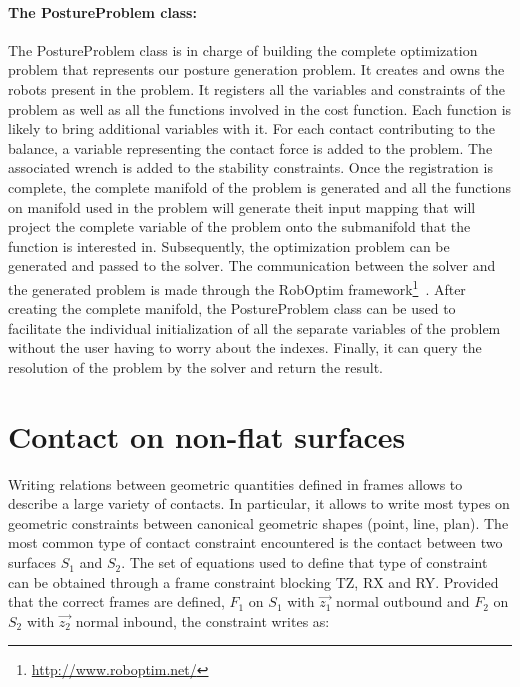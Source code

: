 \paragraph{The PostureProblem class:}
The PostureProblem class is in charge of building the complete optimization problem that represents our posture generation problem.
It creates and owns the robots present in the problem.
It registers all the variables and constraints of the problem as well as all the functions involved in the cost function.
Each function is likely to bring additional variables with it.
For each contact contributing to the balance, a variable representing the contact force is added to the problem.
The associated wrench is added to the stability constraints.
Once the registration is complete, the complete manifold of the problem is generated and all the functions on manifold used in the problem will generate theit input mapping that will project the complete variable of the problem onto the submanifold that the function is interested in.
Subsequently, the optimization problem can be generated and passed to the solver.
The communication between the solver and the generated problem is made through the RobOptim framework\footnote{\url{http://www.roboptim.net/}}~\cite{moulard:jsme:2013, moulard:jrsj:2014}.
After creating the complete manifold, the PostureProblem class can be used to facilitate the individual initialization of all the separate variables of the problem without the user having to worry about the indexes.
Finally, it can query the resolution of the problem by the solver and return the result.



\section{Contact on non-flat surfaces}
\label{sec:contact_on_non_flat_surfaces}

Writing relations between geometric quantities defined in frames allows to describe a large variety of contacts.
In particular, it allows to write most types on geometric constraints between canonical geometric shapes (point, line, plan).
The most common type of contact constraint encountered is the contact between two surfaces $S_1$ and $S_2$.
The set of equations used to define that type of constraint can be obtained through a frame constraint blocking TZ, RX and RY. Provided that the correct frames are defined, $F_1$ on $S_1$ with $\vec{z_1}$ normal outbound and $F_2$ on $S_2$ with $\vec{z_2}$ normal inbound, the constraint writes as:

